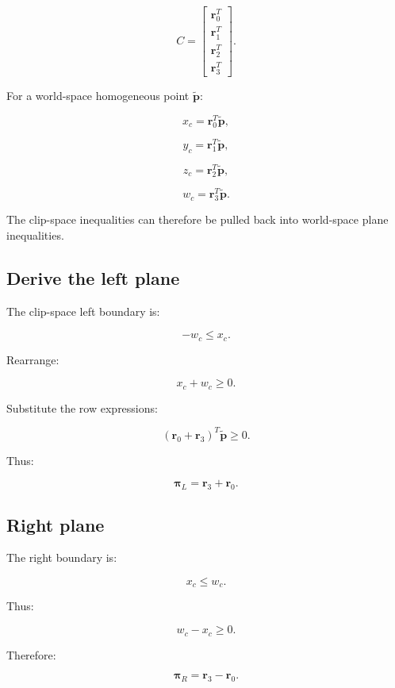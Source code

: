 \[
 C= \begin{bmatrix} \mathbf r_0^T\\ \mathbf r_1^T\\ \mathbf r_2^T\\ \mathbf r_3^T \end{bmatrix}.
\]

For a world-space homogeneous point \(\tilde{\mathbf p}\):

\[
 x_c=\mathbf r_0^T\tilde{\mathbf p},
\]

\[
 y_c=\mathbf r_1^T\tilde{\mathbf p},
\]

\[
 z_c=\mathbf r_2^T\tilde{\mathbf p},
\]

\[
 w_c=\mathbf r_3^T\tilde{\mathbf p}.
\]

The clip-space inequalities can therefore be pulled back into world-space plane inequalities.

\subsection{Derive the left plane}\label{02-foundations-ii-ch034-derive-the-left-plane}

\hypertarget{02-foundations-ii-ch034-derive-the-left-plane}{}

The clip-space left boundary is:

\[
 -w_c\le x_c.
\]

Rearrange:

\[
 x_c+w_c\ge0.
\]

Substitute the row expressions:

\[
 (\mathbf r_0+\mathbf r_3)^T\tilde{\mathbf p}\ge0.
\]

Thus:

\[
 \boxed{ \boldsymbol\pi_L=\mathbf r_3+\mathbf r_0 }.
\]

\subsection{Right plane}\label{02-foundations-ii-ch034-right-plane}

\hypertarget{02-foundations-ii-ch034-right-plane}{}

The right boundary is:

\[
 x_c\le w_c.
\]

Thus:

\[
 w_c-x_c\ge0.
\]

Therefore:

\[
 \boxed{ \boldsymbol\pi_R=\mathbf r_3-\mathbf r_0 }.
\]

